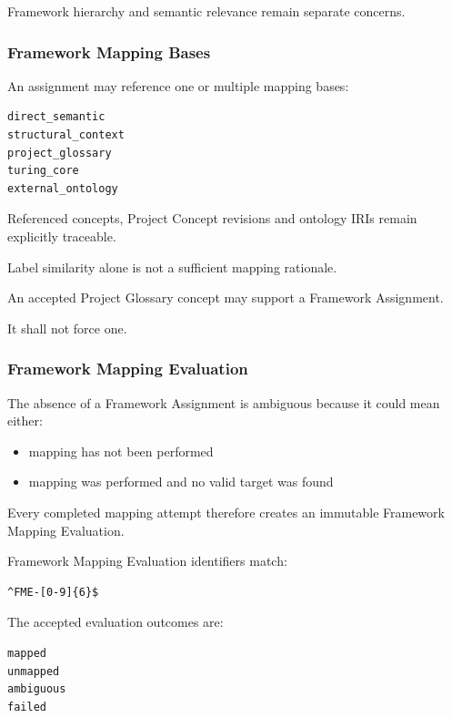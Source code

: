 Framework hierarchy and semantic relevance remain separate concerns.

\hypertarget{framework-mapping-bases}{%
\subsubsection{Framework Mapping Bases}\label{framework-mapping-bases}}

An assignment may reference one or multiple mapping bases:

\begin{verbatim}
direct_semantic
structural_context
project_glossary
turing_core
external_ontology
\end{verbatim}

Referenced concepts, Project Concept revisions and ontology IRIs remain explicitly traceable.

Label similarity alone is not a sufficient mapping rationale.

An accepted Project Glossary concept may support a Framework Assignment.

It shall not force one.

\hypertarget{framework-mapping-evaluation}{%
\subsubsection{Framework Mapping Evaluation}\label{framework-mapping-evaluation}}

The absence of a Framework Assignment is ambiguous because it could mean either:

\begin{itemize}
\tightlist
\item
  mapping has not been performed
\item
  mapping was performed and no valid target was found
\end{itemize}

Every completed mapping attempt therefore creates an immutable Framework Mapping Evaluation.

Framework Mapping Evaluation identifiers match:

\begin{verbatim}
^FME-[0-9]{6}$
\end{verbatim}

The accepted evaluation outcomes are:

\begin{verbatim}
mapped
unmapped
ambiguous
failed
\end{verbatim}


